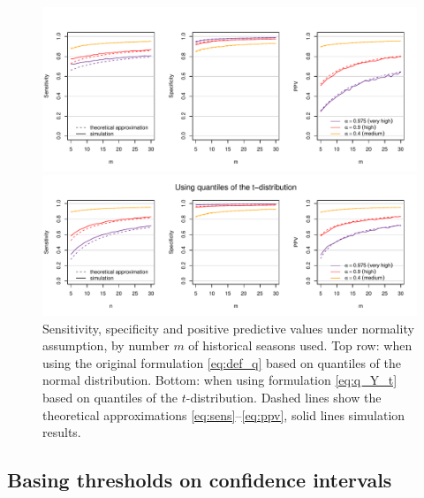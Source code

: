 \documentclass[12pt]{article}
\begin{document}
\begin{figure}[h!]
\begin{center}
\includegraphics[scale=0.75]{figure/analytical_sens_spec.pdf} \vspace{-5mm}

\includegraphics[scale=0.75]{figure/analytical_sens_spec_t.pdf}
\end{center}

\vspace{-10mm}

\caption{Sensitivity, specificity and positive predictive values under normality assumption, by number $m$ of historical seasons used. Top row: when using the original formulation \eqref{eq:def_q} based on quantiles of the normal distribution. Bottom: when using formulation \eqref{eq:q_Y_t} based on quantiles of the $t$-distribution. Dashed lines show the theoretical approximations \eqref{eq:sens}--\eqref{eq:ppv}, solid lines simulation results.}
\label{fig:sens_spec_ana}
\end{figure}



\subsection{Basing thresholds on confidence intervals}
\label{subsec:cis}
\end{document}
